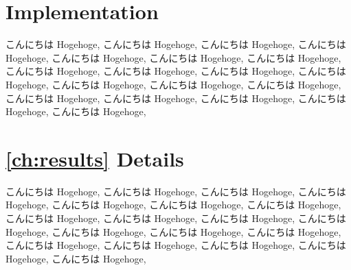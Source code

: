 \appendix

\chapter{Implementation}\label{ch:appx:implement}
こんにちは Hogehoge, こんにちは Hogehoge, こんにちは Hogehoge, こんにちは Hogehoge, こんにちは Hogehoge, こんにちは Hogehoge, こんにちは Hogehoge, こんにちは Hogehoge, こんにちは Hogehoge, こんにちは Hogehoge, こんにちは Hogehoge, こんにちは Hogehoge, こんにちは Hogehoge, こんにちは Hogehoge, こんにちは Hogehoge, こんにちは Hogehoge, こんにちは Hogehoge, こんにちは Hogehoge, こんにちは Hogehoge, 

\chapter{\cref{ch:results} Details}\label{ch:appx:result-detail}
こんにちは Hogehoge, こんにちは Hogehoge, こんにちは Hogehoge, こんにちは Hogehoge, こんにちは Hogehoge, こんにちは Hogehoge, こんにちは Hogehoge, こんにちは Hogehoge, こんにちは Hogehoge, こんにちは Hogehoge, こんにちは Hogehoge, こんにちは Hogehoge, こんにちは Hogehoge, こんにちは Hogehoge, こんにちは Hogehoge, こんにちは Hogehoge, こんにちは Hogehoge, こんにちは Hogehoge, こんにちは Hogehoge, 